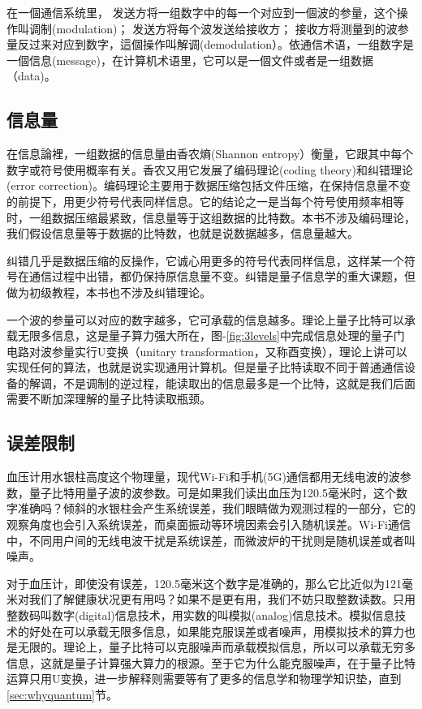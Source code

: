 \documentclass{ctexbook}
\begin{document}
在一個通信系统里， 发送方将一组数字中的每一个对应到一個波的参量，这个操作叫调制(modulation)； 发送方将每个波发送给接收方； 接收方将测量到的波参量反过来对应到数字，這個操作叫解调(demodulation）。依通信术语，一组数字是一個信息(message)，在计算机术语里，它可以是一個文件或者是一组数据（data)。

\subsection{信息量}
在信息論裡，一组数据的信息量由香农熵(Shannon entropy）衡量，它跟其中每个数字或符号使用概率有关。香农又用它发展了编码理论(coding theory)和纠错理论(error correction)。编码理论主要用于数据压缩包括文件压缩，在保持信息量不变的前提下，用更少符号代表同样信息。它的结论之一是当每个符号使用频率相等时，一组数据压缩最紧致，信息量等于这组数据的比特数。本书不涉及编码理论，我们假设信息量等于数据的比特数，也就是说数据越多，信息量越大。

纠错几乎是数据压缩的反操作，它诚心用更多的符号代表同样信息，这样某一个符号在通信过程中出错，都仍保持原信息量不变。纠错是量子信息学的重大课题，但做为初级教程，本书也不涉及纠错理论。

一个波的参量可以对应的数字越多，它可承载的信息越多。理论上量子比特可以承载无限多信息，这是量子算力强大所在，图-\ref{fig:3levels}中完成信息处理的量子门电路对波参量实行U变换（unitary transformation，又称酉变换），理论上讲可以实现任何的算法，也就是说实现通用计算机。但是量子比特读取不同于普通通信设备的解调，不是调制的逆过程，能读取出的信息最多是一个比特，这就是我们后面需要不断加深理解的量子比特读取瓶颈。

\subsection{误差限制}
血压计用水银柱高度这个物理量，现代Wi-Fi和手机(5G)通信都用无线电波的波参数，量子比特用量子波的波参数。可是如果我们读出血压为120.5毫米时，这个数字准确吗？倾斜的水银柱会产生系统误差，我们眼睛做为观测过程的一部分，它的观察角度也会引入系统误差，而桌面振动等环境因素会引入随机误差。Wi-Fi通信中，不同用户间的无线电波干扰是系统误差，而微波炉的干扰则是随机误差或者叫噪声。

对于血压计，即使没有误差，120.5毫米这个数字是准确的，那么它比近似为121毫米对我们了解健康状况更有用吗？如果不是更有用，我们不妨只取整数读数。只用整数码叫数字(digital)信息技术，用实数的叫模拟(analog)信息技术。模拟信息技术的好处在可以承载无限多信息，如果能克服误差或者噪声，用模拟技术的算力也是无限的。理论上，量子比特可以克服噪声而承载模拟信息，所以可以承载无穷多信息，这就是量子计算强大算力的根源。至于它为什么能克服噪声，在于量子比特运算只用U变换，进一步解释则需要等有了更多的信息学和物理学知识垫，直到\ref{sec:whyquantum}节。
\end{document}
